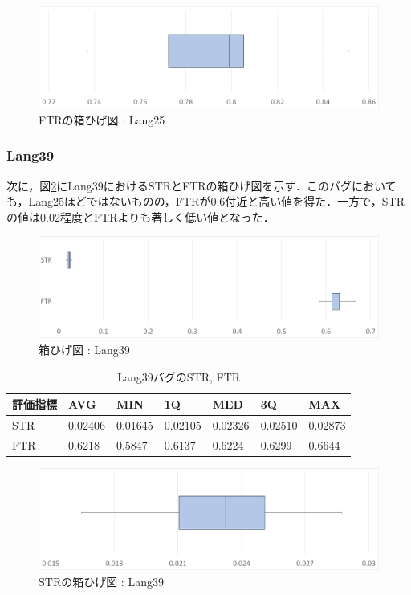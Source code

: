 \documentclass[uplatex,dvipdfmx,a4paper]{jsarticle}
\begin{document}
\begin{figure}[t]
  \centering
  \includegraphics[width=\linewidth]{fig/Lang25_boxplot_FTR.png}
  \caption{FTRの箱ひげ図 : Lang25}
  \label{fig:Lang25_boxplot_FTR}
\end{figure}
\subsubsection{Lang39}
次に，図\ref{fig:Lang39_boxplot}にLang39におけるSTRとFTRの箱ひげ図を示す．このバグにおいても，Lang25ほどではないものの，FTRが0.6付近と高い値を得た．一方で，STRの値は0.02程度とFTRよりも著しく低い値となった．
\begin{figure}[t]
  \centering
  \includegraphics[width=\linewidth]{fig/Lang39_boxplot.png}
  \caption{箱ひげ図 : Lang39}
  \label{fig:Lang39_boxplot}
\end{figure}
\begin{table}[b]
  \centering
  \caption{Lang39バグのSTR, FTR}
  \label{tab:Lang39}
  \begin{tabular}{l|llllll} \hline\hline
    評価指標 & AVG         & MIN & 1Q & MED & 3Q & MAX   \\\hline
    STR & 0.02406 & 0.01645 & 0.02105 & 0.02326 & 0.02510 & 0.02873  \\
    FTR & 0.6218 & 0.5847 & 0.6137 & 0.6224 & 0.6299 & 0.6644 \\\hline\hline
  \end{tabular}
\end{table}
\begin{figure}[t]
  \centering
  \includegraphics[width=\linewidth]{fig/Lang39_boxplot_STR.png}
  \caption{STRの箱ひげ図 : Lang39}
  \label{fig:Lang39_boxplot_STR}
\end{figure}
\end{document}
